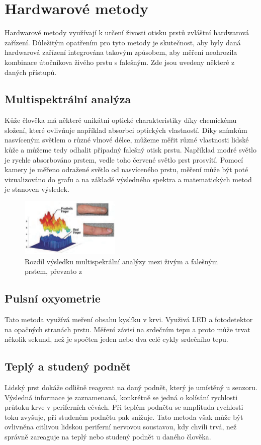 \section{Hardwarové metody}
Hardwarové metody využívají k určení živosti otisku prstů zvláštní hardwarová zařízení. Důležitým opatřením pro tyto metody je skutečnost, aby byly daná hardwarová zařízení integrována takovým způsobem, aby měření neohrozila kombinace útočníkova živého prstu s falešným. Zde jsou uvedeny některé z daných přístupů.
\subsection{Multispektrální analýza}
Kůže člověka má některé unikátní optické charakteristiky díky chemickému složení, které ovlivňuje například absorbci optických vlastností. Díky snímkům nasvíceným světlem o různé vlnové délce, můžeme měřit různé vlastnosti lidské kůže a můžeme tedy odhalit případný falešný otisk prstu. Například modré světlo je rychle absorbováno prstem, vedle toho červené světlo prst prosvítí. Pomocí kamery je měřeno odražené světlo od nasvíceného prstu, měření může být poté vizualizováno do grafu a na základě výsledného spektra a matematických metod je stanoven výsledek. \cite{AdvancedBiometricsTechnologies2011}

\begin{figure}[!htbp]
    \centering
    \includegraphics[width=180px]{obrazky-figures/multispectralAnalysis.PNG}
    \caption{Rozdíl výsledku multispekrální analýzy mezi živým a falešným prstem, převzato z \cite{AdvancedBiometricsTechnologies2011}}
\end{figure}

\subsection{Pulsní oxyometrie}
Tato metoda využívá meření obsahu kyslíku v krvi. Využivá LED a fotodetektor na opačných stranách prstu. Měření závisí na srdečním tepu a proto může trvat několik sekund, než je spočten jeden nebo dva celé cykly srdečního tepu. \cite{BiometricsEncyclopedia2009}
\subsection{Teplý a studený podnět}
Lidský prst dokáže odlišně reagovat na daný podnět, který je umístěný u senzoru. Výsledná informace je zaznamenaná, konkrétně se jedná o kolísání rychlosti průtoku krve v periferních cévách. Při teplém podnětu se amplituda rychlosti toku zvyšuje, při studeném podnětu pak snižuje. Tato metoda však může být ovlivněna citlivou lidskou periferní nervovou soustavou, kdy chvíli trvá, než správně zareaguje na teplý nebo studený podnět u daného člověka. \cite{AdvancedBiometricsTechnologies2011}
